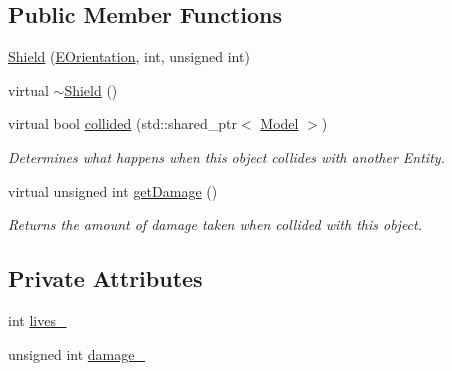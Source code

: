 \subsection*{\-Public \-Member \-Functions}
\begin{DoxyCompactItemize}
\item 
\hyperlink{classmodels_1_1Shield_aad64a171c14035e280404e89505af69c}{\-Shield} (\hyperlink{namespacemodels_adec64ede5178a8b8fed882b3790d423d}{\-E\-Orientation}, int, unsigned int)
\item 
virtual \hyperlink{classmodels_1_1Shield_a14775df5566dc70b63ec1ebf49515f93}{$\sim$\-Shield} ()
\item 
virtual bool \hyperlink{classmodels_1_1Shield_aace9fad1f5bb8ba868dc5c47d8ac170a}{collided} (std\-::shared\-\_\-ptr$<$ \hyperlink{classmodels_1_1Model}{\-Model} $>$)
\begin{DoxyCompactList}\small\item\em \-Determines what happens when this object collides with another \-Entity. \end{DoxyCompactList}\item 
virtual unsigned int \hyperlink{classmodels_1_1Shield_a50210fb74fa1592a36c8897e3b54244d}{get\-Damage} ()
\begin{DoxyCompactList}\small\item\em \-Returns the amount of damage taken when collided with this object. \end{DoxyCompactList}\end{DoxyCompactItemize}
\subsection*{\-Private \-Attributes}
\begin{DoxyCompactItemize}
\item 
int \hyperlink{classmodels_1_1Shield_a95d939400ec96e1ff81ec28a364fa513}{lives\-\_\-}
\item 
unsigned int \hyperlink{classmodels_1_1Shield_a7c6fa435bbdc366203d63a07a6ee92a6}{damage\-\_\-}
\end{DoxyCompactItemize}


